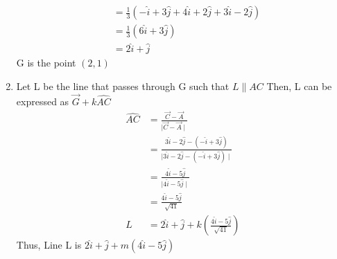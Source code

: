\documentclass[12pt, a4paper]{article}
\begin{document}
\begin{enumerate}
\begin{align*}
        &= \frac{1}{3}(-\hat{i} + 3\hat{j} + 4\hat{i} + 2\hat{j} + 3\hat{i} - 2\hat{j})
        \\
        &=\frac{1}{3}(6\hat{i} + 3\hat{j})
        \\
        &= 2\hat{i} + \hat{j}
    \end{align*}
    G is the point $(2,1)$
\item Let L be the line that passes through G such that $L \parallel AC$
    Then, L can be expressed as $\vec{G} + k\hat{AC}$
    \begin{align*}
        \hat{AC} &= \frac{\vec{C} - \vec{A}}{\mid \vec{C} - \vec{A} \mid}
		\\        
        &= \frac{3\hat{i} - 2\hat{j} - (-\hat{i} + 3\hat{j})}{\mid 3\hat{i} - 2\hat{j} - (-\hat{i} + 3\hat{j}) \mid}
        \\
        &= \frac{4\hat{i} - 5\hat{j}}{\mid 4\hat{i} - 5\hat{j} \mid}
		\\        
        &= \frac{4\hat{i} - 5\hat{j}}{\sqrt{41}}
        \\
        L &= 2\hat{i} + \hat{j} + k(\frac{4\hat{i} - 5\hat{j}}{\sqrt{41}})
    \end{align*}
    Thus, Line L is $2\hat{i} + \hat{j} + m(4\hat{i} - 5\hat{j})$
\end{enumerate}
\end{document}
